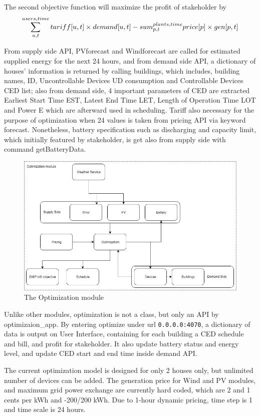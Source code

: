 \documentclass[runningheads]{llncs}
\begin{document}
The second objective function will maximize the profit of stakeholder by \newline
\[\displaystyle \sum_{u,t}^{\\users,time} tariff[u,t] \times demand[u,t] - sum_{p,t}^{\\plants,time} price[p] \times gen[p,t]\]

From supply side API, PVforecast and Windforecast are called for estimated supplied energy for the next 24 hours, and from demand side API, a dictionary of houses' information is returned by calling buildings, which includes, building names, ID, Uncontrollable Devices UD consumption and Controllable Devices CED list; also from demand side, 4 important parameters of CED are extracted Earliest Start Time EST, Latest End Time LET, Length of Operation Time LOT and Power E which are afterward used in scheduling. Tariff also necessary for the purpose of optimization when 24 values is taken from pricing API via keyword forecast. Nonetheless, battery specification such as discharging and capacity limit, which initially featured by stakeholder, is get also from supply side with command getBatteryData.

\begin{figure}[H]
	\centering
	\includegraphics[width=0.7\columnwidth]{Optimization.jpg}
	\caption{The Optimization module}
	\label{img:optimization_module}
\end{figure}

Unlike other modules, optimization is not a class, but only an API by optimizaion\_app. By entering optimize under url \texttt{0.0.0.0:4070}, a dictionary of data is output on User Interface, containing for each building a CED schedule and bill, and profit for stakeholder. It also update battery status and energy level, and update CED start and end time inside demand API.

The current optimization model is designed for only 2 houses only, but unlimited number of devices can be added. The generation price for Wind and PV modules, and maximum grid power exchange are currently hard coded, which are 2 and 1 cents per kWh and -200/200 kWh. Due to 1-hour dynamic pricing, time step is 1 and  time scale is 24 hours.
\end{document}
